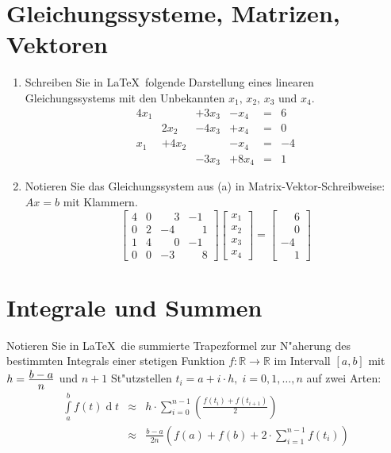 \documentclass[12pt]{scrartcl}
\begin{document}
\section{Gleichungssysteme, Matrizen, Vektoren}
\begin{enumerate}
\item
Schreiben Sie in \LaTeX\ folgende Darstellung eines linearen Gleichungssystems mit den Unbekannten $x_1,\,x_2,\, x_3$ und $x_4$. 
\[
 \begin{array}{rrrrrr}
    4x_1  &        & + 3x_3  &  - x_4 & = & 6\\
          & 2x_2   & - 4x_3  &  + x_4  & = & 0\\ 
    x_1   & + 4x_2 &         &  - x_4  & = & -4\\
          &        & - 3x_3  &  + 8x_4 & = & 1
 \end{array}  
\]
\item Notieren Sie das Gleichungssystem aus (a) in Matrix-Vektor-Schreibweise: $A x = b$ mit Klammern.
  \begin{equation*}
    \begin{bmatrix}
      4  &  0     & \phantom{-}3  &  {-}1\\
      0  & 2   & {-}4  &  \phantom{-}1\\ 
      1   & 4 &     \phantom{{-}}0   &  {-}1 \\
      0   &  0     & {-}3  &  \phantom{-}8
    \end{bmatrix}
    \begin{bmatrix}
      x_1\\x_2\\x_3\\x_4
    \end{bmatrix}
    =
    \begin{bmatrix}
      \phantom{{-}}6\\\phantom{{-}}0\\{-}4\\\phantom{{-}}1
    \end{bmatrix}
  \end{equation*}
\end{enumerate}


\section{Integrale und Summen}

Notieren Sie in \LaTeX\ die summierte Trapezformel zur N"aherung des bestimmten
Integrals einer stetigen Funktion $f: \mathbb R \to \mathbb R$ im Intervall $[a,b]$ mit \\ $h = \frac{\textstyle \rule{0em}{0.8em} b-a}{\textstyle \rule{0em}{0.8em} n}$ und $n+1$ St"utzstellen $t_i= a + i\cdot h, \; i = 0,1,\ldots, n$ auf zwei Arten: 
\begin{eqnarray*}
  \int\limits_a^bf(t) \operatorname{d} t & \approx & h\cdot  \sum_{i = 0}^{n-1}\left (\frac{ f(t_i)  + f(t_{i+1})}{ 2}\right)
\\
 & \approx & \frac{b-a}{2 n}\left ( f(a)  + f(b) + 2 \cdot \sum_{i = 1}^{n-1} f(t_i)\right)
 \end{eqnarray*}
\end{document}
